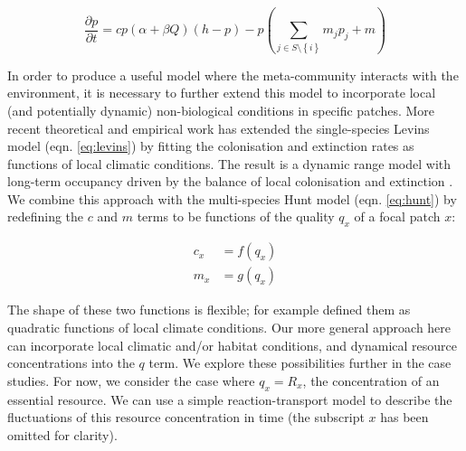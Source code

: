 \begin{equation}
	\frac{\partial p}{\partial t} = c p(\alpha + \beta Q) \left( h-p \right) - p \left( \sum_{j \in S \setminus \left\{i \right\} }{m_{j}p_j} + m \right)
	\label{eq:metacom}
\end{equation}

In order to produce a useful model where the meta-community interacts with the environment, it is necessary to further extend this model to incorporate local (and potentially dynamic) non-biological conditions in specific patches.
More recent theoretical \autocite{Holt2000,Holt2005} and empirical \autocite{Talluto2017} work has extended the single-species Levins model (eqn. \ref{eq:levins}) by fitting the colonisation and extinction rates as functions of local climatic conditions.
The result is a dynamic range model with long-term occupancy driven by the balance of local colonisation and extinction \autocite{Talluto2017}.
We combine this approach with the multi-species Hunt model (eqn. \ref{eq:hunt}) by redefining the $c$ and $m$ terms to be functions of the quality $q_x$ of a focal patch $x$:

\begin{equation}
\begin{split}
	c_{x} &= f(q_{x}) \label{eq:talluto} \\
	m_{x} &= g(q_{x})
\end{split}
\end{equation}


The shape of these two functions is flexible; for example \textcite{Talluto2017} defined them as quadratic functions of local climate conditions.
Our more general approach here can incorporate local climatic and/or habitat conditions, and dynamical resource concentrations into the $q$ term.
We explore these possibilities further in the case studies.
For now, we consider the case where $q_x = R_x$, the concentration of an essential resource.
We can use a simple reaction-transport model \autocite{Soetaert2009} to describe the fluctuations of this resource concentration in time (the subscript $x$ has been omitted for clarity).

